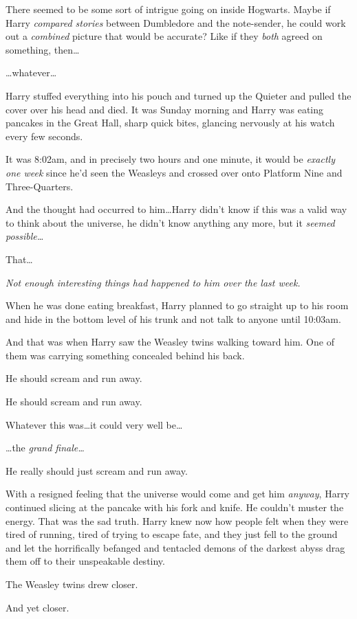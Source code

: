 There seemed to be some sort of intrigue going on inside Hogwarts. Maybe if
Harry \emph{compared stories} between Dumbledore and the note-sender, he could
work out a \emph{combined} picture that would be accurate? Like if they
\emph{both} agreed on something, then…

…whatever…

Harry stuffed everything into his pouch and turned up the Quieter and pulled
the cover over his head and died.
\later
It was Sunday morning and Harry was eating pancakes in the Great Hall, sharp
quick bites, glancing nervously at his watch every few seconds.

It was 8:02am, and in precisely two hours and one minute, it would be
\emph{exactly one week} since he’d seen the Weasleys and crossed over onto
Platform Nine and Three-Quarters.

And the thought had occurred to him…Harry didn’t know if this was a
valid way to think about the universe, he didn’t know anything any more, but it
\emph{seemed possible…}

That…

\emph{Not enough interesting things had happened to him over the last week.}

When he was done eating breakfast, Harry planned to go straight up to his room
and hide in the bottom level of his trunk and not talk to anyone until 10:03am.

And that was when Harry saw the Weasley twins walking toward him. One of them
was carrying something concealed behind his back.

He should scream and run away.

He should scream and run away.

Whatever this was…it could very well be…

…the \emph{grand finale…}

He really should just scream and run away.

With a resigned feeling that the universe would come and get him \emph{anyway},
Harry continued slicing at the pancake with his fork and knife. He couldn’t
muster the energy. That was the sad truth. Harry knew now how people felt when
they were tired of running, tired of trying to escape fate, and they just fell
to the ground and let the horrifically befanged and tentacled demons of the
darkest abyss drag them off to their unspeakable destiny.

The Weasley twins drew closer.

And yet closer.

